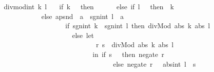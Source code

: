 \begin{isabellebody}
\begin{isamarkuptext}
divmod{}int\ k\ l\ {}\isanewline
\ \ {}if\ k\ {}{}\ {}\ then\ {}{}{}\ {}{}\isanewline
\ \ \ \ else\ {}if\ l\ {}{}\ {}\ then\ {}{}{}\ k{}\isanewline
\ \ \ \ \ \ \ \ \ \ \ else\ apsnd\ {}{}\ a\ {}{}\ sgn{}int\ l\ {}\ a{}\isanewline
\ \ \ \ \ \ \ \ \ \ \ \ \ \ \ \ \ \ {}if\ sgn{}int\ k\ {}{}\ sgn{}int\ l\ then\ divMod\ {}abs\ k{}\ {}abs\ l{}\isanewline
\ \ \ \ \ \ \ \ \ \ \ \ \ \ \ \ \ \ \ \ else\ let\ {}\isanewline
\ \ \ \ \ \ \ \ \ \ \ \ \ \ \ \ \ \ \ \ \ \ \ \ \ \ \ {}r{}\ s{}\ {}\ divMod\ {}abs\ k{}\ {}abs\ l{}{}\isanewline
\ \ \ \ \ \ \ \ \ \ \ \ \ \ \ \ \ \ \ \ \ \ \ \ \ {}\ in\ {}if\ s\ {}{}\ {}\ then\ {}negate\ r{}\ {}{}\isanewline
\ \ \ \ \ \ \ \ \ \ \ \ \ \ \ \ \ \ \ \ \ \ \ \ \ \ \ \ \ \ \ \ else\ {}negate\ r\ {}\ {}{}\ abs{}int\ l\ {}\ s{}{}{}{}{}{}\isanewline

\end{isamarkuptext}
\end{isabellebody}
